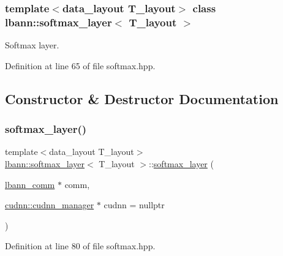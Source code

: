 \subsubsection*{template$<$data\+\_\+layout T\+\_\+layout$>$\newline
class lbann\+::softmax\+\_\+layer$<$ T\+\_\+layout $>$}

Softmax layer. 

Definition at line 65 of file softmax.\+hpp.



\subsection{Constructor \& Destructor Documentation}
\mbox{\label{classlbann_1_1softmax__layer_aeac8e8c98c838929afc9ab6c82af24d2}} 
\subsubsection{\texorpdfstring{softmax\+\_\+layer()}{softmax\_layer()}\hspace{0.1cm}{\footnotesize\ttfamily [1/2]}}
{\footnotesize\ttfamily template$<$data\+\_\+layout T\+\_\+layout$>$ \\
\hyperlink{classlbann_1_1softmax__layer}{lbann\+::softmax\+\_\+layer}$<$ T\+\_\+layout $>$\+::\hyperlink{classlbann_1_1softmax__layer}{softmax\+\_\+layer} (\begin{DoxyParamCaption}\item[{\hyperlink{classlbann_1_1lbann__comm}{lbann\+\_\+comm} $\ast$}]{comm,  }\item[{\hyperlink{classlbann_1_1cudnn_1_1cudnn__manager}{cudnn\+::cudnn\+\_\+manager} $\ast$}]{cudnn = {\ttfamily nullptr} }\end{DoxyParamCaption})\hspace{0.3cm}{\ttfamily [inline]}}



Definition at line 80 of file softmax.\+hpp.


